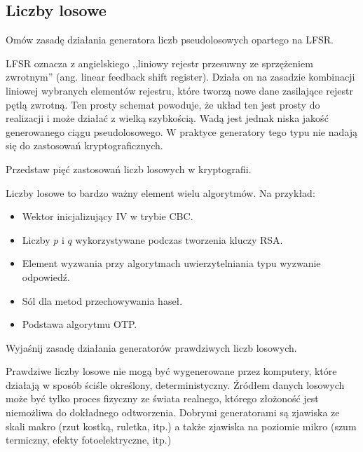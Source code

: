 \documentclass[answers,11pt]{exam}
\begin{document}
\subsection{Liczby losowe}
\begin{questions}

\question Omów zasadę działania generatora liczb pseudolosowych opartego na LFSR.
\begin{solution}
LFSR oznacza z angielskiego ,,liniowy rejestr przesuwny ze sprzężeniem zwrotnym'' (ang. linear feedback shift register). Działa on na zasadzie kombinacji liniowej wybranych elementów rejestru, które tworzą nowe dane zasilające rejestr pętlą zwrotną. Ten prosty schemat powoduje, że układ ten jest prosty do realizacji i może działać z wielką szybkością. Wadą jest jednak niska jakość generowanego ciągu pseudolosowego. W praktyce generatory tego typu nie nadają się do zastosowań kryptograficznych.
\end{solution}

\question Przedstaw pięć zastosowań liczb losowych w kryptografii.
\begin{solution}
Liczby losowe to bardzo ważny element wielu algorytmów. Na przykład:
\begin{itemize}
\item Wektor inicjalizujący IV w trybie CBC.
\item Liczby $p$ i $q$ wykorzystywane podczas tworzenia kluczy RSA.
\item Element wyzwania przy algorytmach uwierzytelniania typu wyzwanie odpowiedź.
\item Sól dla metod przechowywania haseł.
\item Podstawa algorytmu OTP.
\end{itemize}
\end{solution}

\question Wyjaśnij zasadę działania generatorów prawdziwych liczb losowych.
\begin{solution}
Prawdziwe liczby losowe nie mogą być wygenerowane przez komputery, które działają w sposób ściśle określony, deterministyczny. Źródłem danych losowych może być tylko proces fizyczny ze świata realnego, którego złożoność jest niemożliwa do dokładnego odtworzenia. Dobrymi generatorami są zjawiska ze skali makro (rzut kostką, ruletka, itp.) a także zjawiska na poziomie mikro (szum termiczny, efekty fotoelektryczne, itp.)
\end{solution}


\end{questions}
\end{document}
